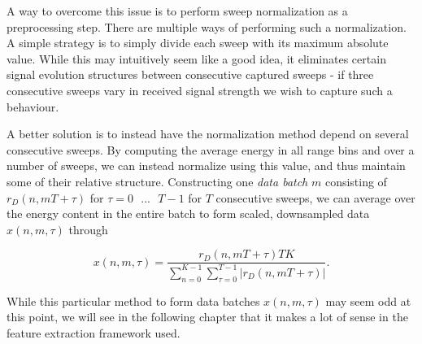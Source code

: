 A way to overcome this issue is to perform sweep normalization as a preprocessing step. There are multiple ways of performing such a normalization. A simple strategy is to simply divide each sweep with its maximum absolute value. While this may intuitively seem like a good idea, it eliminates certain signal evolution structures between consecutive captured sweeps - if three consecutive sweeps vary in received signal strength we wish to capture such a behaviour. 

A better solution is to instead have the normalization method depend on several consecutive sweeps. By computing the average energy in all range bins and over a number of sweeps, we can instead normalize using this value, and thus maintain some of their relative structure. Constructing one \emph{data batch} $m$ consisting of $r_D(n,mT + \tau)$ for $\tau=0\text{ }...\text{ }T-1$ for $T$ consecutive sweeps, we can average over the energy content in the entire batch to form scaled, downsampled data $x(n,m,\tau)$ through

\begin{equation}
	x(n,m,\tau) = 
	\frac{r_{D}(n,mT + \tau)TK}
	{\sum_{n=0}^{K-1}\sum_{\tau=0}^{T-1}|r_{D}(n,mT + \tau)|}.
\end{equation}

While this particular method to form data batches $x(n,m,\tau)$ may seem odd at this point, we will see in the following chapter that it makes a lot of sense in the feature extraction framework used.
